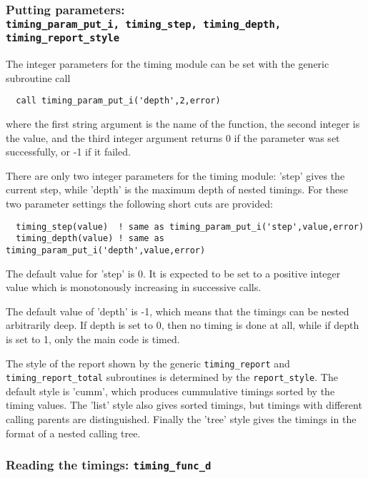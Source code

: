 \documentclass[10pt]{article}
\begin{document}
\subsubsection{Putting parameters: \\
{\tt timing\_param\_put\_i, timing\_step, timing\_depth, 
timing\_report\_style}}

The integer parameters for the timing module can be set with the generic
subroutine call
\begin{verbatim}
  call timing_param_put_i('depth',2,error)
\end{verbatim}
where the first string argument is the name of the function,
the second integer is the value, and the third integer argument
returns 0 if the parameter was set successfully, or -1 if it failed.

There are only two integer parameters for the timing module:
'step' gives the current step, while 'depth' is the maximum
depth of nested timings. For these two parameter settings the 
following short cuts are provided:
{\small
\begin{verbatim}
  timing_step(value)  ! same as timing_param_put_i('step',value,error)
  timing_depth(value) ! same as timing_param_put_i('depth',value,error)
\end{verbatim}
}
The default value for 'step' is 0. It is expected to be set to
a positive integer value which is monotonously increasing in
successive calls.

The default value of 'depth' is -1, which 
means that the timings can be nested arbitrarily deep. 
If depth is set to 0, then no timing is done at all, while
if depth is set to 1, only the main code is timed.

The style of the report shown by the generic 
{\tt timing\_report} and  {\tt timing\_report\_total} subroutines
is determined by the {\tt report\_style}. The default style is
'cumm', which produces cummulative timings sorted by the timing values.
The 'list' style also gives sorted timings, but timings with different calling
parents are distinguished. Finally the 'tree' style gives the timings
in the format of a nested calling tree.

\subsubsection{Reading the timings: {\tt timing\_func\_d}}
\end{document}
